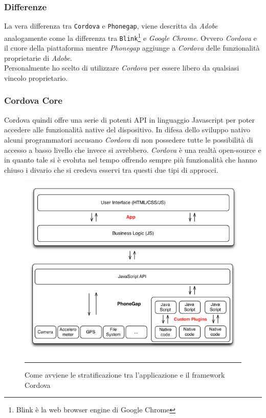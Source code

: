 \subsubsection{Differenze}
La vera differenza tra \texttt{Cordova} e \texttt{Phonegap}, viene descritta da \emph{Adobe} analogamente come la differenza tra \texttt{Blink}\footnote{Blink è la web browser engine di Google Chrome\cite{wiki:blink}} e \emph{Google Chrome}. Ovvero \emph{Cordova} e il cuore della piattaforma mentre \emph{Phonegap} aggiunge a \emph{Cordova} delle funzionalità proprietarie di \emph{Adobe}.\\
Personalmente ho scelto di utilizzare \emph{Cordova} per essere libero da qualsiasi vincolo proprietario.

\subsubsection{Cordova Core}
Cordova quindi offre una serie di potenti API in linguaggio Javascript per poter accedere alle funzionalità native del dispositivo. In difesa dello sviluppo nativo alcuni programmatori accusano \emph{Cordova} di non possedere tutte le possibilità di accesso a basso livello che invece si avrebbero. \emph{Cordova} è una realtà open-source e in quanto tale si è evoluta nel tempo offrendo sempre più funzionalità che hanno chiuso i divario che si credeva esservi tra questi due tipi di approcci.

\begin{figure}[!h]
  \centering
    \includegraphics[scale=0.65]{Figures/cordova_schema.png} 
    \rule{35em}{0.5pt}
  \caption[Struttura a Livelli di Cordova]{Come avviene le stratificazione tra l'applicazione e il framework Cordova}
  \label{fig:cordova-layers}
\end{figure}

